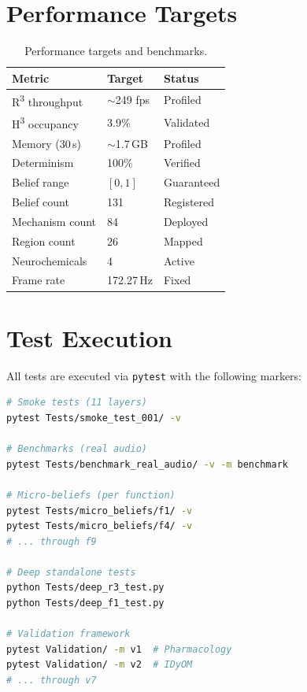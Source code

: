 \documentclass[10pt,twocolumn]{article}
\newcommand{\Rthree}{R\textsuperscript{3}}
\newcommand{\Hthree}{H\textsuperscript{3}}
\begin{document}
\section{Performance Targets}
\label{sec:performance}

\begin{table}[H]
\centering
\caption{Performance targets and benchmarks.}\label{tab:performance}
\small
\begin{tabular}{@{}L{3cm} R{2cm} R{1.5cm}@{}}
\toprule
\textbf{Metric} & \textbf{Target} & \textbf{Status} \\
\midrule
{}
\Rthree{} throughput & $\sim$249 fps & Profiled \\
\Hthree{} occupancy & 3.9\% & Validated \\
Memory (30\,s) & $\sim$1.7\,GB & Profiled \\
Determinism & 100\% & Verified \\
Belief range & $[0,1]$ & Guaranteed \\
Belief count & 131 & Registered \\
Mechanism count & 84 & Deployed \\
Region count & 26 & Mapped \\
Neurochemicals & 4 & Active \\
Frame rate & 172.27\,Hz & Fixed \\
\bottomrule
\end{tabular}
\end{table}

\section{Test Execution}
\label{sec:execution}

All tests are executed via \texttt{pytest} with the following markers:

\begin{lstlisting}[language=bash]
# Smoke tests (11 layers)
pytest Tests/smoke_test_001/ -v

# Benchmarks (real audio)
pytest Tests/benchmark_real_audio/ -v -m benchmark

# Micro-beliefs (per function)
pytest Tests/micro_beliefs/f1/ -v
pytest Tests/micro_beliefs/f4/ -v
# ... through f9

# Deep standalone tests
python Tests/deep_r3_test.py
python Tests/deep_f1_test.py

# Validation framework
pytest Validation/ -m v1  # Pharmacology
pytest Validation/ -m v2  # IDyOM
# ... through v7
\end{lstlisting}
\end{document}
